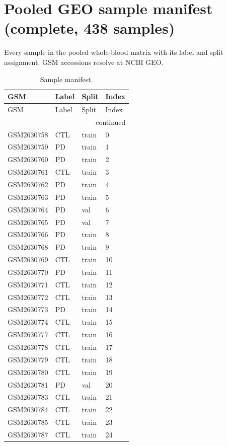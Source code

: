 \section{Pooled GEO sample manifest (complete, 438 samples)}
Every sample in the pooled whole-blood matrix with its label and split assignment. GSM accessions resolve at NCBI GEO.
\begin{footnotesize}\begin{longtable}{llll}
\caption{Sample manifest.}\\ \toprule
GSM & Label & Split & Index \\ \midrule \endfirsthead
\toprule GSM & Label & Split & Index \\ \midrule \endhead
\midrule \multicolumn{4}{r}{continued}\\ \endfoot \bottomrule \endlastfoot
GSM2630758 & CTL & train & 0 \\
GSM2630759 & PD & train & 1 \\
GSM2630760 & PD & train & 2 \\
GSM2630761 & CTL & train & 3 \\
GSM2630762 & PD & train & 4 \\
GSM2630763 & PD & train & 5 \\
GSM2630764 & PD & val & 6 \\
GSM2630765 & PD & val & 7 \\
GSM2630766 & PD & train & 8 \\
GSM2630768 & PD & train & 9 \\
GSM2630769 & CTL & train & 10 \\
GSM2630770 & PD & train & 11 \\
GSM2630771 & CTL & train & 12 \\
GSM2630772 & CTL & train & 13 \\
GSM2630773 & PD & train & 14 \\
GSM2630774 & CTL & train & 15 \\
GSM2630777 & CTL & train & 16 \\
GSM2630778 & CTL & train & 17 \\
GSM2630779 & CTL & train & 18 \\
GSM2630780 & CTL & train & 19 \\
GSM2630781 & PD & val & 20 \\
GSM2630783 & CTL & train & 21 \\
GSM2630784 & CTL & train & 22 \\
GSM2630785 & CTL & train & 23 \\
GSM2630787 & CTL & train & 24 \\

\end{longtable}
\end{footnotesize}
